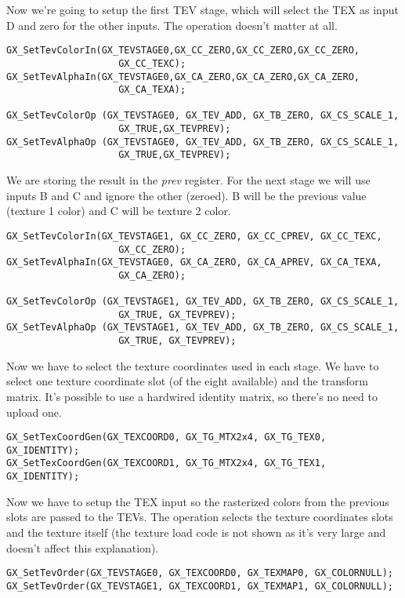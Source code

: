 \documentclass[12pt]{article}
\begin{document}
Now we're going to setup the first TEV stage, which will select the TEX as input D and zero for the other inputs. The operation doesn't matter at all.

\begin{lstlisting}[frame=single]
GX_SetTevColorIn(GX_TEVSTAGE0,GX_CC_ZERO,GX_CC_ZERO,GX_CC_ZERO,
					GX_CC_TEXC);
GX_SetTevAlphaIn(GX_TEVSTAGE0,GX_CA_ZERO,GX_CA_ZERO,GX_CA_ZERO,
					GX_CA_TEXA);

GX_SetTevColorOp (GX_TEVSTAGE0, GX_TEV_ADD, GX_TB_ZERO, GX_CS_SCALE_1,
					GX_TRUE,GX_TEVPREV);
GX_SetTevAlphaOp (GX_TEVSTAGE0, GX_TEV_ADD, GX_TB_ZERO, GX_CS_SCALE_1,
					GX_TRUE,GX_TEVPREV);
\end{lstlisting}


We are storing the result in the \emph{prev} register. For the next stage we will use inputs B and C and ignore the other (zeroed). B will be the previous value (texture 1 color) and C will be texture 2 color.

\begin{lstlisting}[frame=single]
GX_SetTevColorIn(GX_TEVSTAGE1, GX_CC_ZERO, GX_CC_CPREV, GX_CC_TEXC,
					GX_CC_ZERO);
GX_SetTevAlphaIn(GX_TEVSTAGE0, GX_CA_ZERO, GX_CA_APREV, GX_CA_TEXA,
					GX_CA_ZERO);

GX_SetTevColorOp (GX_TEVSTAGE1, GX_TEV_ADD, GX_TB_ZERO, GX_CS_SCALE_1,
					GX_TRUE, GX_TEVPREV);
GX_SetTevAlphaOp (GX_TEVSTAGE1, GX_TEV_ADD, GX_TB_ZERO, GX_CS_SCALE_1,
					GX_TRUE, GX_TEVPREV);
\end{lstlisting}

Now we have to select the texture coordinates used in each stage. We have to select one texture coordinate slot (of the eight available)  and the transform matrix. It's possible to use a hardwired identity matrix, so there's no need to upload one.

\begin{lstlisting}[frame=single]
GX_SetTexCoordGen(GX_TEXCOORD0, GX_TG_MTX2x4, GX_TG_TEX0, GX_IDENTITY);
GX_SetTexCoordGen(GX_TEXCOORD1, GX_TG_MTX2x4, GX_TG_TEX1, GX_IDENTITY);
\end{lstlisting}

Now we have to setup the TEX input so the rasterized colors from the previous slots are passed to the TEVs. The operation selects the texture coordinates slots and the texture itself (the texture load code is not shown as it's very large and doesn't affect this explanation).

\begin{lstlisting}[frame=single]
GX_SetTevOrder(GX_TEVSTAGE0, GX_TEXCOORD0, GX_TEXMAP0, GX_COLORNULL);
GX_SetTevOrder(GX_TEVSTAGE1, GX_TEXCOORD1, GX_TEXMAP1, GX_COLORNULL);
\end{lstlisting}
\end{document}
